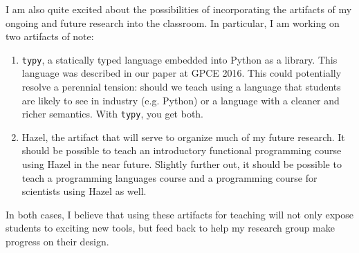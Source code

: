 \documentclass[9pt]{extarticle}
\begin{document}
I am also quite excited about the possibilities of incorporating the artifacts of my ongoing and future research into the classroom. In particular, I am working on two artifacts of note:
\begin{enumerate}
	\item \texttt{typy}, a statically typed language embedded into Python as a library. This language was described in our paper at GPCE 2016. This could potentially resolve a perennial tension: should we teach using a language that students are likely to see in industry (e.g. Python) or a language with a cleaner and richer semantics. With \texttt{typy}, you get both.
	\item Hazel, the artifact that will serve to organize much of my future research. It should be possible to teach an introductory functional programming course using Hazel in the near future. Slightly further out, it should be possible to teach a programming languages course and a programming course for scientists using Hazel as well.
\end{enumerate}
In both cases, I believe that using these artifacts for teaching will not only expose students to exciting new tools, but feed back to help my research group make progress on their design.
\end{document}
